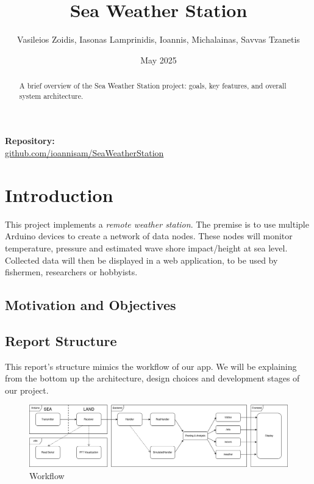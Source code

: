 \documentclass{article}
\title{Sea Weather Station}
\author{Vasileios Zoidis, Iasonas Lamprinidis, Ioannis, Michalainas, Savvas Tzanetis}
\date{May 2025}
\begin{document}
\maketitle
\begin{center}
  \textbf{Repository:} \\
  \href{https://github.com/ioannisam/SeaWeatherStation}{github.com/ioannisam/SeaWeatherStation}
\end{center}
\bigskip
\begin{abstract}
    A brief overview of the Sea Weather Station project: goals, key features, and overall system architecture.
\end{abstract}
\tableofcontents
\clearpage

\section{Introduction}
This project implements a \textit{remote weather station}. The premise is to use multiple Arduino devices to create a network of data nodes. These nodes will monitor temperature, pressure and estimated wave shore impact/height at sea level. Collected data will then be displayed in a web application, to be used by fishermen, researchers or hobbyists.
    
    \subsection{Motivation and Objectives}
    
    \subsection{Report Structure}
    This report's structure mimics the workflow of our app. We will be explaining from the bottom up the architecture, design choices and development stages of our project.

    \begin{figure} [h]
        \centering
        \includegraphics[width=1\linewidth]{assets/workflow.png}
        \caption{Workflow}
        \label{fig:enter-label}
    \end{figure}
    
\end{document}

